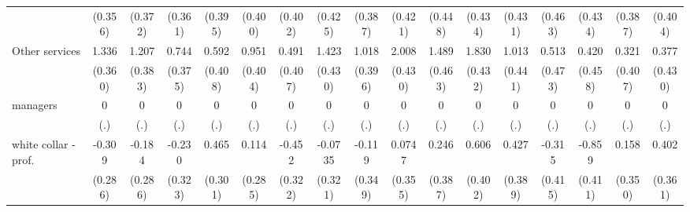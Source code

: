 {\begin{tabular}{l*{16}{c}}
                    &     (0.356)         &     (0.372)         &     (0.361)         &     (0.395)         &     (0.400)         &     (0.402)         &     (0.425)         &     (0.387)         &     (0.421)         &     (0.448)         &     (0.434)         &     (0.431)         &     (0.463)         &     (0.434)         &     (0.387)         &     (0.404)         \\
[1em]
Other services      &       1.336\sym{***}&       1.207\sym{**} &       0.744\sym{*}  &       0.592         &       0.951\sym{*}  &       0.491         &       1.423\sym{***}&       1.018\sym{*}  &       2.008\sym{***}&       1.489\sym{**} &       1.830\sym{***}&       1.013\sym{*}  &       0.513         &       0.420         &       0.321         &       0.377         \\
                    &     (0.360)         &     (0.383)         &     (0.375)         &     (0.408)         &     (0.404)         &     (0.407)         &     (0.430)         &     (0.396)         &     (0.430)         &     (0.463)         &     (0.432)         &     (0.441)         &     (0.473)         &     (0.458)         &     (0.407)         &     (0.430)         \\
[1em]
managers            &           0         &           0         &           0         &           0         &           0         &           0         &           0         &           0         &           0         &           0         &           0         &           0         &           0         &           0         &           0         &           0         \\
                    &         (.)         &         (.)         &         (.)         &         (.)         &         (.)         &         (.)         &         (.)         &         (.)         &         (.)         &         (.)         &         (.)         &         (.)         &         (.)         &         (.)         &         (.)         &         (.)         \\
[1em]
white collar - prof.&      -0.309         &      -0.184         &      -0.230         &       0.465         &       0.114         &      -0.452         &     -0.0735         &      -0.119         &      0.0747         &       0.246         &       0.606         &       0.427         &      -0.315         &      -0.859\sym{*}  &       0.158         &       0.402         \\
                    &     (0.286)         &     (0.286)         &     (0.323)         &     (0.301)         &     (0.285)         &     (0.322)         &     (0.321)         &     (0.349)         &     (0.355)         &     (0.387)         &     (0.402)         &     (0.389)         &     (0.415)         &     (0.411)         &     (0.350)         &     (0.361)         \\

\end{tabular}}
